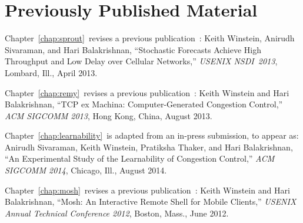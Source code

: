 \chapter*{Previously Published Material}
%

{
\setlength{\parindent}{0 pt}
\setlength{\parskip}{\baselineskip}

Chapter~\ref{chap:sprout}~revises a previous
publication~\cite{sprout}: Keith Winstein, Anirudh Sivaraman, and Hari
Balakrishnan, ``Stochastic Forecasts Achieve High Throughput and Low
Delay over Cellular Networks,'' \textit{USENIX NSDI~2013}, Lombard,
Ill., April 2013.

Chapter~\ref{chap:remy}~revises a previous publication~\cite{remy}:
Keith Winstein and Hari Balakrishnan, ``TCP ex Machina:
Computer-Generated Congestion Control,'' \textit{ACM SIGCOMM 2013},
Hong Kong, China, August 2013.

Chapter~\ref{chap:learnability}~is adapted from an in-press
submission, to appear as: Anirudh Sivaraman, Keith Winstein, Pratiksha
Thaker, and Hari Balakrishnan, ``An Experimental Study of the
Learnability of Congestion Control,'' \emph{ACM SIGCOMM 2014},
Chicago, Ill., August 2014.

Chapter~\ref{chap:mosh}~revises a previous publication~\cite{mosh}:
Keith Winstein and Hari Balakrishnan, ``Mosh: An Interactive Remote
Shell for Mobile Clients,'' \textit{USENIX Annual Technical Conference
  2012}, Boston, Mass., June 2012.
}
